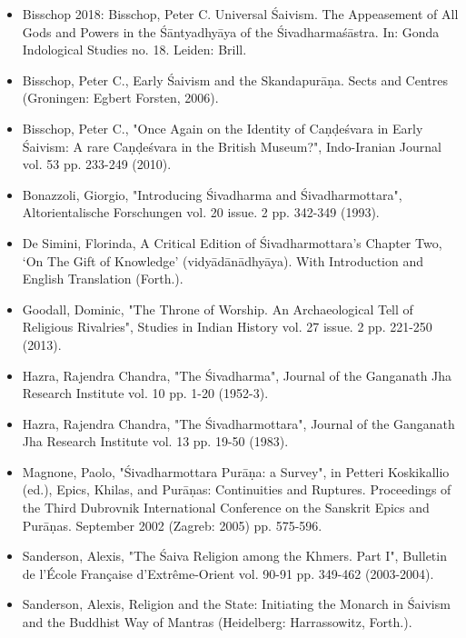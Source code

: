 \documentclass[11pt]{article}
\begin{document}
\begin{itemize}
\item Bisschop 2018: Bisschop, Peter C. Universal Śaivism. The Appeasement of All Gods and Powers in the Śāntyadhyāya of the Śivadharmaśāstra. In: Gonda Indological Studies no. 18. Leiden: Brill.

\item Bisschop, Peter C., Early Śaivism and the Skandapurāṇa. Sects and Centres (Groningen: Egbert Forsten, 2006).

\item Bisschop, Peter C., "Once Again on the Identity of Caṇḍeśvara in Early Śaivism: A rare Caṇḍeśvara in the British Museum?", Indo-Iranian Journal vol. 53 pp. 233-249 (2010).

\item Bonazzoli, Giorgio, "Introducing Śivadharma and Śivadharmottara", Altorientalische Forschungen vol. 20 issue. 2 pp. 342-349 (1993).

\item De Simini, Florinda, A Critical Edition of Śivadharmottara’s Chapter Two, ‘On The Gift of Knowledge’ (vidyādānādhyāya). With Introduction and English Translation (Forth.).

\item Goodall, Dominic, "The Throne of Worship. An Archaeological Tell of Religious Rivalries", Studies in Indian History vol. 27 issue. 2 pp. 221-250 (2013).

\item Hazra, Rajendra Chandra, "The Śivadharma", Journal of the Ganganath Jha Research Institute vol. 10 pp. 1-20 (1952-3).

\item Hazra, Rajendra Chandra, "The Śivadharmottara", Journal of the Ganganath Jha Research Institute vol. 13 pp. 19-50 (1983).

\item Magnone, Paolo, "Śivadharmottara Purāṇa: a Survey", in Petteri Koskikallio (ed.), Epics, Khilas, and Purāṇas: Continuities and Ruptures. Proceedings of the Third Dubrovnik International Conference on the Sanskrit Epics and Purāṇas. September 2002 (Zagreb: 2005) pp. 575-596.

\item Sanderson, Alexis, "The Śaiva Religion among the Khmers. Part I", Bulletin de l'École Française d'Extrême-Orient vol. 90-91 pp. 349-462 (2003-2004).

\item Sanderson, Alexis, Religion and the State: Initiating the Monarch in Śaivism and the Buddhist Way of Mantras (Heidelberg: Harrassowitz, Forth.).


\end{itemize}
\end{document}
